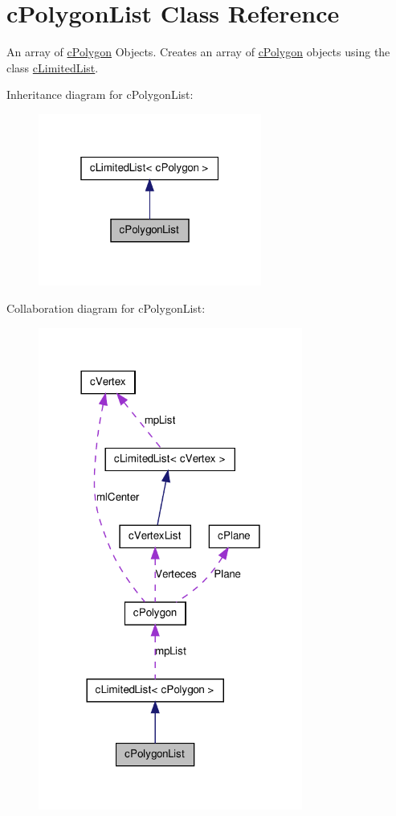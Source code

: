 \hypertarget{classc_polygon_list}{
\section{cPolygonList Class Reference}
\label{classc_polygon_list}
}


An array of \hyperlink{classc_polygon}{cPolygon} Objects. Creates an array of \hyperlink{classc_polygon}{cPolygon} objects using the class \hyperlink{classc_limited_list}{cLimitedList}.  




Inheritance diagram for cPolygonList:
\nopagebreak
\begin{figure}[H]
\begin{center}
\leavevmode
\includegraphics[width=208pt]{classc_polygon_list__inherit__graph}
\end{center}
\end{figure}


Collaboration diagram for cPolygonList:
\nopagebreak
\begin{figure}[H]
\begin{center}
\leavevmode
\includegraphics[width=246pt]{classc_polygon_list__coll__graph}
\end{center}
\end{figure}
